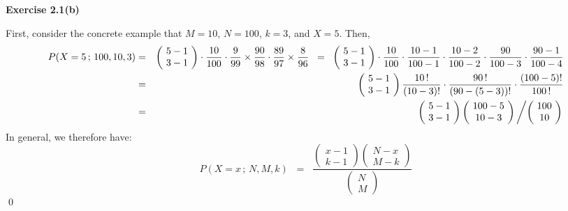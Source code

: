 \newpage
\noindent
\textbf{Exercise 2.1(b)}

First, consider the concrete example that $M = 10$, $N = 100$, $k = 3$, and $X = 5$.
Then,
\begin{eqnarray*}
         P(X = 5\,;\,100,10,3)
&=&      \left(\!\begin{array}{c} 5 - 1 \\ 3 - 1 \end{array}\!\right)
         \cdot \dfrac{10}{100}
         \cdot \dfrac{9}{99}
         \times\dfrac{90}{98}
         \cdot \dfrac{89}{97}
         \times\dfrac{8}{96}
\;\;=\;\;\left(\!\begin{array}{c} 5 - 1 \\ 3 - 1 \end{array}\!\right)
         \cdot\dfrac{10  }{100}
         \cdot\dfrac{10-1}{100-1}
         \cdot\dfrac{10-2}{100-2}
         \cdot\dfrac{90  }{100-3}
         \cdot\dfrac{90-1}{100-4}
\\
&=&      \left(\!\begin{array}{c} 5 - 1 \\ 3 - 1 \end{array}\!\right)
         \dfrac{10\,!}{(10-3)!} \cdot \dfrac{90\,!}{(90-(5-3))!} \cdot \dfrac{(100-5)!}{100\,!}
\\
&=&      \left(\!\begin{array}{c} 5 - 1 \\ 3 - 1 \end{array}\!\right)
         \left(\!\begin{array}{c} 100 - 5 \\ 10 - 3 \end{array}\!\right)
         \left/\left(\!\begin{array}{c} 100 \\ 10 \end{array}\!\right)\right.
\end{eqnarray*}
In general, we therefore have:
\begin{equation*}
P(X = x\,;\,N,M,k)
\;\; = \;\;
\dfrac{
\left(\!\begin{array}{c} x - 1 \\ k - 1 \end{array}\!\right)
\left(\!\begin{array}{c} N - x \\ M - k \end{array}\!\right)
}{
\left(\!\begin{array}{c} N \\ M \end{array}\!\right)
}
\end{equation*}
\qed
